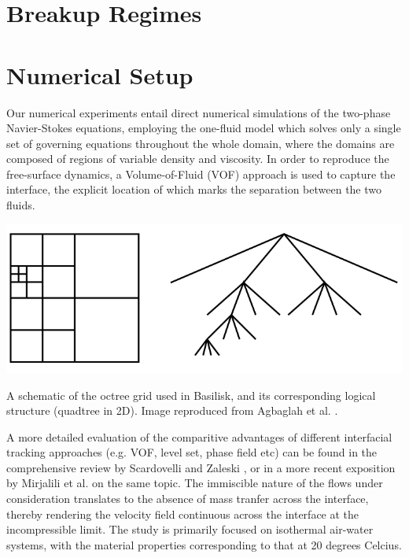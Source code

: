\section{Breakup Regimes}

\blindtext

\blindtext


\blindtext




\section{Numerical Setup}
Our numerical experiments entail direct numerical simulations of the two-phase
Navier-Stokes equations, employing the one-fluid model which  
solves only a single set of governing equations throughout the whole domain,
where the domains are composed of regions of variable density and viscosity. 
In order to reproduce the free-surface dynamics, a Volume-of-Fluid 
(VOF) approach is used to capture the interface, the explicit location 
of which marks the separation between the two fluids.


\begin{marginfigure}
\centering
\includegraphics{plots/ligament_breakup/octree.png}
\caption{A schematic of the octree grid used in Basilisk, and its
	corresponding logical structure (quadtree in 2D).
	Image reproduced from Agbaglah et al. \cite{agbag}.
	}
\label{octree}
\end{marginfigure}


A more detailed evaluation of the comparitive advantages of different  
interfacial tracking approaches (e.g. VOF, level set, phase field etc) 
can be found in the comprehensive review by Scardovelli and Zaleski 
\cite{zaleskiannual}, or in a more recent exposition by  
Mirjalili et al. \cite{mirjalili2017interface} on the same topic.
The immiscible nature of the flows under consideration translates to the 
absence of mass tranfer across the interface, thereby rendering the 
velocity field continuous across the interface at the incompressible limit. 
The study is primarily focused on isothermal air-water systems, with 
the material properties corresponding to that at 20 degrees Celcius. 

